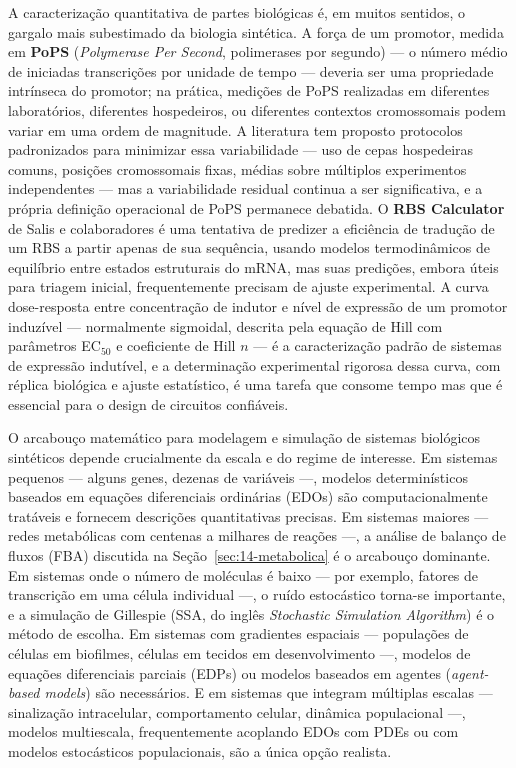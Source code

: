 A caracterização quantitativa de partes biológicas é, em muitos sentidos, o gargalo mais subestimado da biologia sintética. A força de um promotor, medida em \textbf{PoPS} (\emph{Polymerase Per Second}, polimerases por segundo) --- o número médio de iniciadas transcrições por unidade de tempo --- deveria ser uma propriedade intrínseca do promotor; na prática, medições de PoPS realizadas em diferentes laboratórios, diferentes hospedeiros, ou diferentes contextos cromossomais podem variar em uma ordem de magnitude. A literatura tem proposto protocolos padronizados para minimizar essa variabilidade --- uso de cepas hospedeiras comuns, posições cromossomais fixas, médias sobre múltiplos experimentos independentes --- mas a variabilidade residual continua a ser significativa, e a própria definição operacional de PoPS permanece debatida. O \textbf{RBS Calculator} de Salis e colaboradores é uma tentativa de predizer a eficiência de tradução de um RBS a partir apenas de sua sequência, usando modelos termodinâmicos de equilíbrio entre estados estruturais do mRNA, mas suas predições, embora úteis para triagem inicial, frequentemente precisam de ajuste experimental. A curva dose-resposta entre concentração de indutor e nível de expressão de um promotor induzível --- normalmente sigmoidal, descrita pela equação de Hill com parâmetros EC$_{50}$ e coeficiente de Hill $n$ --- é a caracterização padrão de sistemas de expressão indutível, e a determinação experimental rigorosa dessa curva, com réplica biológica e ajuste estatístico, é uma tarefa que consome tempo mas que é essencial para o design de circuitos confiáveis.

O arcabouço matemático para modelagem e simulação de sistemas biológicos sintéticos depende crucialmente da escala e do regime de interesse. Em sistemas pequenos --- alguns genes, dezenas de variáveis ---, modelos determinísticos baseados em equações diferenciais ordinárias (EDOs) são computacionalmente tratáveis e fornecem descrições quantitativas precisas. Em sistemas maiores --- redes metabólicas com centenas a milhares de reações ---, a análise de balanço de fluxos (FBA) discutida na Seção~\ref{sec:14-metabolica} é o arcabouço dominante. Em sistemas onde o número de moléculas é baixo --- por exemplo, fatores de transcrição em uma célula individual ---, o ruído estocástico torna-se importante, e a simulação de Gillespie (SSA, do inglês \emph{Stochastic Simulation Algorithm}) é o método de escolha. Em sistemas com gradientes espaciais --- populações de células em biofilmes, células em tecidos em desenvolvimento ---, modelos de equações diferenciais parciais (EDPs) ou modelos baseados em agentes (\emph{agent-based models}) são necessários. E em sistemas que integram múltiplas escalas --- sinalização intracelular, comportamento celular, dinâmica populacional ---, modelos multiescala, frequentemente acoplando EDOs com PDEs ou com modelos estocásticos populacionais, são a única opção realista.



